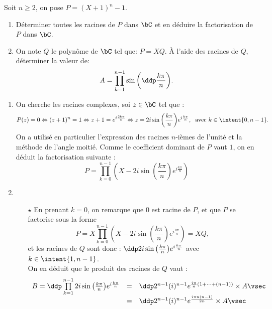 \documentclass[a4paper, 11pt,reqno]{article}
\begin{document}
\begin{exercice}  \;
	Soit $n\geq 2$, on pose $P=(X+1)^n-1$.
	\begin{enumerate}
		\item D\'eterminer toutes les racines de $P$ dans $\bC$ et en d\'eduire la factorisation de $P$ dans $\bC$.
		\item On note $Q$ le polyn\^{o}me de $\bC$ tel que: $P=XQ$. \`{A} l'aide des racines de $Q$, d\'eterminer la valeur de:
		      $$A=\prod\limits_{k=1}^{n-1} \sin{\left(  \ddp\frac{k\pi}{n} \right)}.$$
	\end{enumerate}
\end{exercice}
\begin{correction}  \;
	\begin{enumerate}
		\item On cherche les racines complexes, soi $z \in \bC$ tel que :
		      $$P(z)=0 \Leftrightarrow (z+1)^n=1\Leftrightarrow z+1=e^{i\frac{2k\pi}{n}}\Leftrightarrow
			      z=2i\sin{\left( \frac{k\pi}{n}\right)}e^{i\frac{k\pi}{n}}, \; \textmd{ avec $k\in\intent{ 0,n-1}$}.$$
		      On a utilis\'e en particulier l'expression des racines $n$-i\`{e}mes de l'unit\'e et la m\'ethode de l'angle moiti\'e. Comme le coefficient dominant de $P$ vaut $1$, on en d\'eduit la factorisation suivante :
		      $$P=\prod_{k=0}^{n-1} \left(X-2i \sin \left(\frac{k\pi}{n}\right) e^{i \frac{k\pi}{n}}\right)$$
		\item
		      \begin{itemize}
			      \item[$\star$] En prenant $k=0$, on remarque que $0$ est racine de $P$, et que $P$ se factorise sous la forme
			            $$P= X \prod_{k=0}^{n-1} \left(X-2i \sin \left(\frac{k\pi}{n}\right) e^{i \frac{k\pi}{n}}\right) = XQ,$$
			            et les racines de $Q$ sont donc : $\ddp 2i\sin{\left( \frac{k\pi}{n}\right)}e^{i\frac{k\pi}{n}}$ avec $k\in\intent{ 1,n-1}$.\\
			            On en d\'eduit que le produit des racines de $Q$ vaut :
			            $$\begin{array}{rcl}
					            B = \ddp \prod\limits_{k=1}^{n-1} 2i\sin{\left( \frac{k\pi}{n}\right)}e^{i\frac{k\pi}{n}} & = & \ddp 2^{n-1}(i)^{n-1} e^{\frac{i\pi}{n}(1+\dots+ (n-1))}\times A\vsec \\
					                                                                                                      & = & \ddp 2^{n-1}(i)^{n-1} e^{\frac{i\pi n(n-1)}{2n}}\times A\vsec         \\

\end{array}$$
\end{itemize}
\end{enumerate}
\end{correction}
\end{document}
